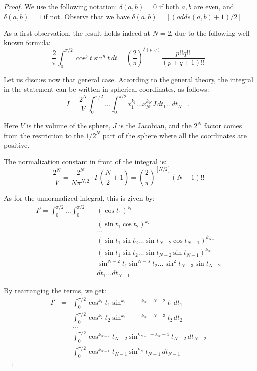 \documentclass[12pt]{amsart}
\begin{document}
\begin{proof}
We use the following notation: $\delta(a,b)=0$ if both $a,b$ are even, and $\delta(a,b)=1$ if not. Observe that we have $\delta(a,b)=[(odds(a,b)+1)/2]$.

As a first observation, the result holds indeed at $N=2$, due to the following well-known formula:
$$\frac{2}{\pi}\int_0^{\pi/2}\cos^pt\sin^qt\,dt=\left(\frac{2}{\pi}\right)^{\delta(p,q)}\frac{p!!q!!}{(p+q+1)!!}$$

Let us discuss now that general case. According to the general theory, the integral in the statement can be written in spherical coordinates, as follows:
$$I=\frac{2^N}{V}\int_0^{\pi/2}\ldots\int_0^{\pi/2}x_1^{k_1}\ldots x_N^{k_N}J\,dt_1\ldots dt_{N-1}$$

Here $V$ is the volume of the sphere, $J$ is the Jacobian, and the $2^N$ factor comes from the restriction to the $1/2^N$ part of the sphere where all the coordinates are positive.

The normalization constant in front of the integral is:
$$\frac{2^N}{V}
=\frac{2^N}{N\pi^{N/2}}\cdot\Gamma\left(\frac{N}{2}+1\right)
=\left(\frac{2}{\pi}\right)^{[N/2]}(N-1)!!$$

As for the unnormalized integral, this is given by:
\begin{eqnarray*}
I'=\int_0^{\pi/2}\ldots\int_0^{\pi/2}
&&(\cos t_1)^{k_1}\\
&&(\sin t_1\cos t_2)^{k_2}\\
&&\ldots\\
&&(\sin t_1\sin t_2\ldots\sin t_{N-2}\cos t_{N-1})^{k_{N-1}}\\
&&(\sin t_1\sin t_2\ldots\sin t_{N-2}\sin t_{N-1})^{k_N}\\
&&\sin^{N-2}t_1\sin^{N-3}t_2\ldots\sin^2t_{N-3}\sin t_{N-2}\\
&&dt_1\ldots dt_{N-1}
\end{eqnarray*}

By rearranging the terms, we get:
\begin{eqnarray*}
I'
&=&\int_0^{\pi/2}\cos^{k_1}t_1\sin^{k_2+\ldots+k_N+N-2}t_1\,dt_1\\
&&\int_0^{\pi/2}\cos^{k_2}t_2\sin^{k_3+\ldots+k_N+N-3}t_2\,dt_2\\
&&\ldots\\
&&\int_0^{\pi/2}\cos^{k_{N-2}}t_{N-2}\sin^{k_{N-1}+k_N+1}t_{N-2}\,dt_{N-2}\\
&&\int_0^{\pi/2}\cos^{k_{N-1}}t_{N-1}\sin^{k_N}t_{N-1}\,dt_{N-1}
\end{eqnarray*}


\end{proof}
\end{document}
